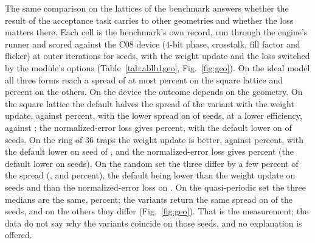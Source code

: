 The same comparison on the lattices of the benchmark answers whether the result of the acceptance task carries to other geometries and whether the loss matters there. Each cell is the benchmark's own record, run through the engine's runner and scored against the C08 device ($4$-bit phase, crosstalk, fill factor and flicker) at \geoIters{} outer iterations for \geoSeeds{} seeds, with the weight update and the loss switched by the module's options (Table~\ref{tab:ablb1geo}, Fig.~\ref{fig:geo}). On the ideal model all three forms reach a spread of at most \geoAIdealMax{} percent on the square lattice and \geoBIdealMax{} percent on the others. On the device the outcome depends on the geometry. On the square lattice the default halves the spread of the variant with the weight update, \geoANSig{} against \geoAWSig{} percent, with the lower spread on \geoALower{} of \geoASeeds{} seeds, at a lower efficiency, \geoANEff{} against \geoAWEff{}; the normalized-error loss gives \geoASSig{} percent, with the default lower on \geoALowerSchroff{} of \geoASeeds{} seeds. On the ring of 36 traps the weight update is better, \geoBWSig{} against \geoBNSig{} percent, with the default lower on \geoBLower{} seed of \geoBSeeds{}, and the normalized-error loss gives \geoBSSig{} percent (the default lower on \geoBLowerSchroff{} seeds). On the random set the three differ by a few percent of the spread (\geoCWSig{}, \geoCNSig{} and \geoCSSig{} percent), the default being lower than the weight update on \geoCLower{} seeds and than the normalized-error loss on \geoCLowerSchroff{}. On the quasi-periodic set the three medians are the same, \geoDWSig{} percent; the variants return the same spread on \geoDSameSeeds{} of the \geoDSeeds{} seeds, and on the others they differ (Fig.~\ref{fig:geo}). That is the measurement; the data do not say why the variants coincide on those seeds, and no explanation is offered.

\begin{table}[t]
\centering\small
\caption{The refinement with the weight update, by default and with the normalized-error loss of Schroff et al.\ on the lattices of the benchmark, C08 device, \geoIters{} outer iterations: median over \geoSeeds{} seeds of the relative standard deviation $\sigma$ and of the efficiency $e$ on the device, and the number of seeds on which the default has the lower spread than the weight update and than the normalized-error loss.}
\label{tab:ablb1geo}
\resizebox{\textwidth}{!}{}
\end{table}

